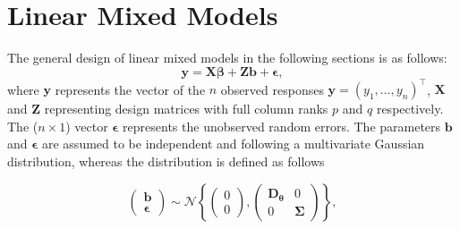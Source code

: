 \section{Linear Mixed Models}
\label{sec:2lmm}

The general design of linear mixed models in the following sections is as follows:
\begin{equation*}
  \label{generalLMM}
  \boldsymbol y = \boldsymbol{X} \boldsymbol \beta +  \boldsymbol {Z} \boldsymbol b +  \boldsymbol \epsilon,
\end{equation*} 
where $ \boldsymbol y$ represents the vector of the $n$ observed responses 
$ \boldsymbol y=(y_1, \dots , y_{n})^\top$, $ \boldsymbol {X}$ and $ \boldsymbol {Z}$ representing design matrices with full column ranks $p$ and $q$
respectively. 
The ($n \times 1$) vector $ \boldsymbol \epsilon$ represents the unobserved random errors.
The parameters $\boldsymbol b$ and $ \boldsymbol \epsilon$ are assumed to be independent and following a multivariate Gaussian distribution, 
whereas the distribution is defined as follows

\begin{equation*}
    \left(\begin{array}{l}{\boldsymbol b} \\ 
    {\boldsymbol \epsilon}\end{array}\right) \sim \mathcal{N}\left\{\left(\begin{array}{l}{0} \\ 
    {0}\end{array}\right),\left(\begin{array}{cc}{\boldsymbol{D_{\theta}}} & {0} \\ 
    {0} & {\boldsymbol \Sigma}\end{array}\right)\right\},
\end{equation*}

